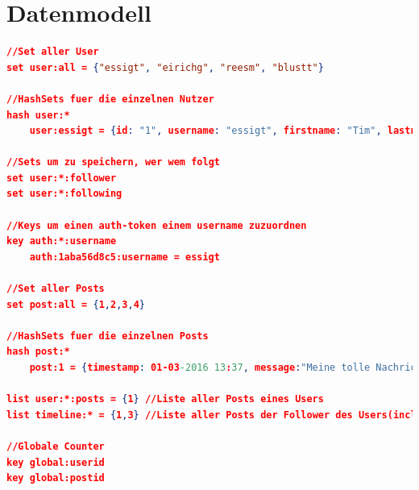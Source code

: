 \documentclass[
    a4paper
]{scrreprt}
\begin{document}
%		
		
		\section{Datenmodell}

		
		\begin{lstlisting}[language=json]
//Set aller User
set user:all = {"essigt", "eirichg", "reesm", "blustt"}

//HashSets fuer die einzelnen Nutzer
hash user:*
	user:essigt = {id: "1", username: "essigt", firstname: "Tim", lastname: "Essig", password: "xyz", auth: "1aba56d8c5"}

//Sets um zu speichern, wer wem folgt
set user:*:follower
set user:*:following

//Keys um einen auth-token einem username zuzuordnen
key auth:*:username
	auth:1aba56d8c5:username = essigt

//Set aller Posts
set post:all = {1,2,3,4}

//HashSets fuer die einzelnen Posts
hash post:*
	post:1 = {timestamp: 01-03-2016 13:37, message:"Meine tolle Nachricht", user:"essigt"}

list user:*:posts = {1} //Liste aller Posts eines Users
list timeline:* = {1,3} //Liste aller Posts der Follower des Users(incl. seiner eigenen)

//Globale Counter
key global:userid
key global:postid
		\end{lstlisting}
	



\end{document}
